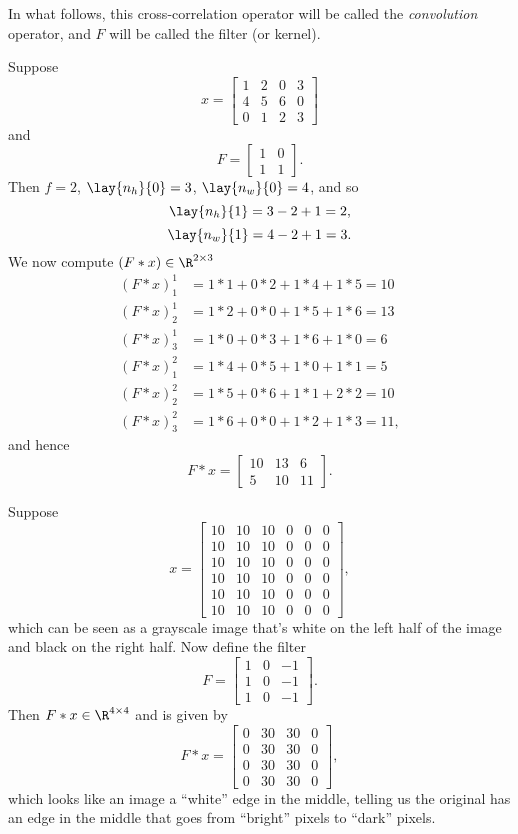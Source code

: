 In what follows, this cross-correlation operator will be called the \textit{convolution} operator, and $F$ will be called the filter (or kernel).

\begin{ex}
	Suppose
	$$x=\begin{bmatrix}
		1&2&0&3\\
		4&5&6&0\\
		0&1&2&3
	\end{bmatrix}$$
	and
	$$F=\begin{bmatrix}
		1&0\\
		1&1
	\end{bmatrix}.$$
	Then $f=2$, $\lay{n_h}{0}=3$, $\lay{n_w}{0}=4$, and so
	$$\lay{n_h}{1}=3-2+1=2,$$
	$$\lay{n_w}{1}=4-2+1=3.$$
	We now compute $(F*x)\in\R^{2\times 3}$
	\begin{align*}
		(F*x)^1_1&=1*1+0*2+1*4+1*5=10\\
		(F*x)^1_2&=1*2+0*0+1*5+1*6=13\\
		(F*x)^1_3&=1*0+0*3+1*6+1*0=6\\
		(F*x)^2_1&=1*4+0*5+1*0+1*1=5\\
		(F*x)^2_2&=1*5+0*6+1*1+2*2=10\\
		(F*x)^2_3&=1*6+0*0+1*2+1*3=11,
	\end{align*}
	and hence
	$$F*x=\begin{bmatrix}
		10&13&6\\
		5&10&11
	\end{bmatrix}.$$
\end{ex}

\begin{ex}
	Suppose
	$$x=\begin{bmatrix}
		10&10&10&0&0&0\\
		10&10&10&0&0&0\\
		10&10&10&0&0&0\\
		10&10&10&0&0&0\\
		10&10&10&0&0&0\\
		10&10&10&0&0&0
	\end{bmatrix},$$
	which can be seen as a grayscale image that's white on the left half of the image and black on the right half.  Now define the filter
	$$F=\begin{bmatrix}
		1&0&-1\\
		1&0&-1\\
		1&0&-1
	\end{bmatrix}.$$
	Then $F*x\in\R^{4\times 4}$ and is given by
	$$F*x=\begin{bmatrix}
		0&30&30&0\\
		0&30&30&0\\
		0&30&30&0\\
		0&30&30&0
	\end{bmatrix},$$
	which looks like an image a ``white'' edge in the middle, telling us the original has an edge in the middle that goes from ``bright'' pixels to ``dark'' pixels.
\end{ex}

